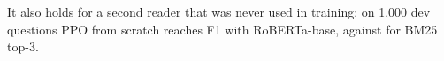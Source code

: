 It also holds for a second reader that was never used in training: on 1{,}000 dev questions PPO from scratch reaches \robScratch{} F1 with RoBERTa-base, against \robBmThree{} for BM25 top-3.
